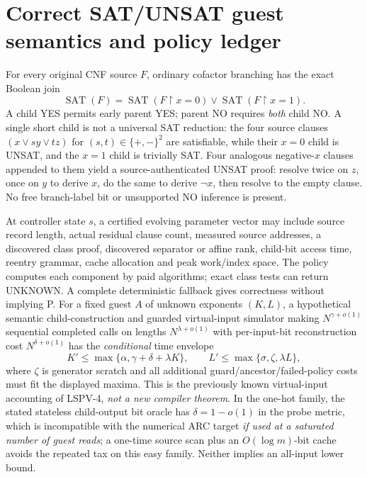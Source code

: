 \documentclass[10pt]{article}
\newcommand{\SAT}{\operatorname{SAT}}
\begin{document}
\section{Correct SAT/UNSAT guest semantics and policy ledger}
For every original CNF source $F$, ordinary cofactor branching has the exact Boolean join
\[
\SAT(F)=\SAT(F\restriction x=0)\lor\SAT(F\restriction x=1).
\tag{7}
\]
A child YES permits early parent YES; parent NO requires \emph{both} child NO. A single short child is not a universal SAT reduction: the four source clauses $(x\vee s y\vee t z)$ for $(s,t)\in\{+,-\}^2$ are satisfiable, while their $x=0$ child is UNSAT, and the $x=1$ child is trivially SAT. Four analogous negative-$x$ clauses appended to them yield a source-authenticated UNSAT proof: resolve twice on $z$, once on $y$ to derive $x$, do the same to derive $\neg x$, then resolve to the empty clause. No free branch-label bit or unsupported NO inference is present.

At controller state $s$, a certified evolving parameter vector may include source record length, actual residual clause count, measured source addresses, a discovered class proof, discovered separator or affine rank, child-bit access time, reentry grammar, cache allocation and peak work/index space. The policy computes each component by paid algorithms; exact class tests can return UNKNOWN. A complete deterministic fallback gives correctness without implying P. For a fixed guest $A$ of unknown exponents $(K,L)$, a hypothetical semantic child-construction and guarded virtual-input simulator making $N^{\gamma+o(1)}$ sequential completed calls on lengths $N^{\lambda+o(1)}$ with per-input-bit reconstruction cost $N^{\delta+o(1)}$ has the \emph{conditional} time envelope
\[
 K'\le\max\{\alpha,\gamma+\delta+\lambda K\},\qquad
 L'\le\max\{\sigma,\zeta,\lambda L\}, \tag{8}
\]
where $\zeta$ is generator scratch and all additional guard/ancestor/failed-policy costs must fit the displayed maxima. This is the previously known virtual-input accounting of LSPV-4, \emph{not a new compiler theorem}. In the one-hot family, the stated stateless child-output bit oracle has $\delta=1-o(1)$ in the probe metric, which is incompatible with the numerical ARC target \emph{if used at a saturated number of guest reads}; a one-time source scan plus an $O(\log m)$-bit cache avoids the repeated tax on this easy family. Neither implies an all-input lower bound.
\end{document}
